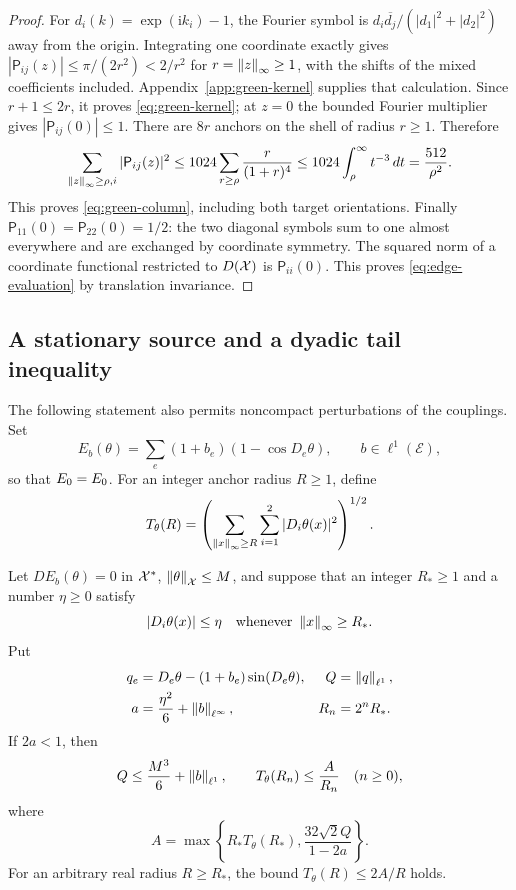 \begin{proof}
For $d_i(k)=\exp(\mathrm i k_i)-1$, the Fourier symbol is
$d_i\overline{d_j}/(|d_1|^2+|d_2|^2)$ away from the origin.
Integrating one coordinate exactly gives
$|\mathsf P_{ij}(z)|\le\pi/(2r^2)<2/r^2$ for
$r=\left\lVert z\right\rVert_\infty\ge1$, with the shifts of the mixed coefficients
included.  Appendix~\ref{app:green-kernel} supplies that calculation.
Since $r+1\le2r$, it proves \eqref{eq:green-kernel}; at $z=0$ the bounded
Fourier multiplier gives $|\mathsf P_{ij}(0)|\le1$.
There are $8r$ anchors on the shell of radius $r\ge1$.  Therefore
\[
 \sum_{\left\lVert z\right\rVert_\infty\ge\rho,i}|\mathsf P_{ij}(z)|^2
 \le1024\sum_{r\ge\rho}\frac{r}{(1+r)^4}
 \le1024\int_\rho^\infty t^{-3}\,dt
 =\frac{512}{\rho^2}.
\]
This proves \eqref{eq:green-column}, including both target orientations.
Finally $\mathsf P_{11}(0)=\mathsf P_{22}(0)=1/2$: the two diagonal
symbols sum to one almost everywhere and are exchanged by coordinate
symmetry.  The squared norm of a coordinate functional restricted to
$D(\mathcal X)$ is $\mathsf P_{ii}(0)$.  This proves
\eqref{eq:edge-evaluation} by translation invariance.
\end{proof}

\subsection{A stationary source and a dyadic tail inequality}

The following statement also permits noncompact perturbations of the
couplings.  Set
\[
 E_b(\theta)=\sum_e(1+b_e)(1-\cos D_e\theta),
 \qquad b\in\ell^1(\mathcal E),
\]
so that $E_0=E_0$.  For an integer anchor radius $R\ge1$, define
\begin{equation}
 T_\theta(R)=
 \left(\sum_{\left\lVert x\right\rVert_\infty\ge R}\sum_{i=1}^2
          |D_i\theta(x)|^2\right)^{1/2}.
 \label{eq:anchor-tail}
\end{equation}

\begin{theorem}
\label{thm:green}
Let $DE_b(\theta)=0$ in $\mathcal X^*$, $\left\lVert\theta\right\rVert_\mathcal X\le M$, and suppose
that an integer $R_*\ge1$ and a number $\eta\ge0$ satisfy
\[
 |D_i\theta(x)|\le\eta
 \quad\text{whenever }\left\lVert x\right\rVert_\infty\ge R_*.
\]
Put
\begin{align}
 q_e&=D_e\theta-(1+b_e)\sin(D_e\theta),
 &Q&=\left\lVert q\right\rVert_{\ell^1},\notag\\
 a&=\frac{\eta^2}{6}+\left\lVert b\right\rVert_{\ell^\infty},
 &R_n&=2^nR_*.
 \label{eq:green-source}
\end{align}
If $2a<1$, then
\begin{equation}
 Q\le\frac{M^3}{6}+\left\lVert b\right\rVert_{\ell^1},\qquad
 T_\theta(R_n)\le\frac{A}{R_n}\quad(n\ge0),
 \label{eq:green-tail}
\end{equation}
where
\begin{equation}
 A=\max\left\{R_*T_\theta(R_*),
       \frac{32\sqrt2 Q}{1-2a}\right\}.
 \label{eq:green-A}
\end{equation}
For an arbitrary real radius $R\ge R_*$, the bound
$T_\theta(R)\le2A/R$ holds.
\end{theorem}

